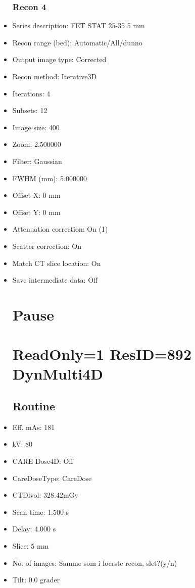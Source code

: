 \documentclass[12pt]{article}
\begin{document}
\begin{itemize}
\subsubsection{Recon 4}
\item Series description: FET STAT 25-35 5 mm
\item Recon range (bed): Automatic/All/dunno
\item Output image type: Corrected
\item Recon method: Iterative3D
\item Iterations: 4
\item Subsets: 12
\item Image size: 400
\item Zoom: 2.500000
\item Filter: Gaussian
\item FWHM (mm): 5.000000
\item Offset X: 0 mm
\item Offset Y: 0 mm
\item Attenuation correction: On (1)
\item Scatter correction: On
\item Match CT slice location: On
\item Save intermediate data: Off
\section{Pause}

\section{ReadOnly=1 ResID=892 DynMulti4D}
\subsection{Routine}
\item Eff. mAs: 181\item kV: 80\item CARE Dose4D: Off\item CareDoseType: CareDose\item CTDlvol: 328.42mGy\item Scan time: 1.500 s\item Delay: 4.000 s\item Slice: 5 mm\item No. of images: Samme som i foerste recon, slet?(y/n)\item Tilt: 0.0 grader

\end{itemize}
\end{document}
